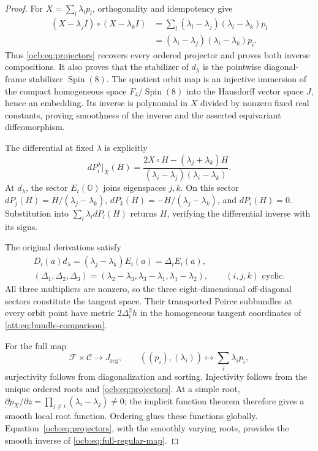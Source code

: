 \documentclass[11pt]{article}
\theoremstyle{definition}
\begin{document}
\begin{proof}
For $X=\sum_l\lambda_l p_l$, orthogonality and idempotency give
\[
 \begin{aligned}
 (X-\lambda_jI)\circ(X-\lambda_kI)
 &=\sum_l(\lambda_l-\lambda_j)(\lambda_l-\lambda_k)p_l\\
 &=(\lambda_i-\lambda_j)(\lambda_i-\lambda_k)p_i.
 \end{aligned}
\]
Thus \eqref{ocb:eq:projectors} recovers every ordered projector and
proves both inverse compositions. It also proves that the stabilizer
of $d_\lambda$ is the pointwise diagonal-frame stabilizer
$\operatorname{Spin}(8)$. The quotient orbit map is an injective
immersion of the compact homogeneous space
$F_4/\operatorname{Spin}(8)$ into the Hausdorff vector space $J$,
hence an embedding. Its inverse is polynomial in $X$ divided by
nonzero fixed real constants, proving smoothness of the inverse and
the asserted equivariant diffeomorphism.

The differential at fixed $\lambda$ is explicitly
\begin{equation}
 dP_i^\lambda|_X(H)=
 \frac{2X\circ H-(\lambda_j+\lambda_k)H}
      {(\lambda_i-\lambda_j)(\lambda_i-\lambda_k)}.
 \label{ocb:eq:projector-differential}\tag{OCB9}
\end{equation}
At $d_\lambda$, the sector $E_i(\mathbb O)$ joins eigenspaces $j,k$.
On this sector $dP_j(H)=H/(\lambda_j-\lambda_k)$,
$dP_k(H)=-H/(\lambda_j-\lambda_k)$, and $dP_i(H)=0$.
Substitution into $\sum_l\lambda_l dP_l(H)$ returns $H$, verifying
the differential inverse with its signs.

The original derivations satisfy
\begin{equation}
 \begin{gathered}
 D_i(a)d_\lambda=(\lambda_j-\lambda_k)E_i(a)=\Delta_i E_i(a),\\
 (\Delta_1,\Delta_2,\Delta_3)=
 (\lambda_2-\lambda_3,\lambda_3-\lambda_1,\lambda_1-\lambda_2),
 \qquad(i,j,k)\text{ cyclic}.
 \end{gathered}
 \label{ocb:eq:tangent-multipliers}\tag{OCB10}
\end{equation}
All three multipliers are nonzero, so the three eight-dimensional
off-diagonal sectors constitute the tangent space. Their transported
Peirce subbundles at every orbit point have metric $2\Delta_i^2h$
in the homogeneous tangent coordinates of
\eqref{att:eq:bundle-comparison}.

For the full map
\begin{equation}
 \mathcal F\times\mathcal C\longrightarrow J_{\mathrm{reg}},
 \qquad ((p_i),(\lambda_i))\longmapsto\sum_i\lambda_i p_i,
 \label{ocb:eq:full-regular-map}\tag{OCB11}
\end{equation}
surjectivity follows from diagonalization and sorting. Injectivity
follows from the unique ordered roots and \eqref{ocb:eq:projectors}.
At a simple root,
$\partial p_X/\partial z=\prod_{j\ne i}(\lambda_i-\lambda_j)\ne0$;
the implicit function theorem therefore gives a smooth local root
function. Ordering glues these functions globally.
Equation~\eqref{ocb:eq:projectors}, with the smoothly varying roots,
provides the smooth inverse of \eqref{ocb:eq:full-regular-map}.
\end{proof}
\end{document}
